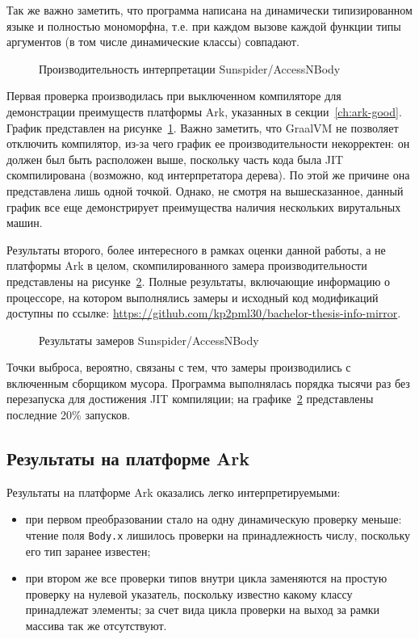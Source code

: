 \documentclass[times
]{itmo-student-thesis}
\begin{document}
Так же важно заметить, что программа написана на динамически типизированном языке и полностью мономорфна, т.е. при каждом вызове каждой функции типы аргументов (в том числе динамические классы) совпадают.

\begin{figure}[!h]
	\caption{Производительность интерпретации Sunspider/AccessNBody}\label{fig:accessnbodyinterpres}
	\resizebox{\textwidth}{!}{}
\end{figure}

Первая проверка производилась при выключенном компиляторе для демонстрации преимуществ платформы Ark, указанных в секции~\ref{ch:ark-good}. График представлен на рисунке~\ref{fig:accessnbodyinterpres}. Важно заметить, что GraalVM не позволяет отключить компилятор, из-за чего график ее производительности некорректен: он должен был быть расположен выше, поскольку часть кода была JIT скомпилирована (возможно, код интерпретатора дерева). По этой же причине она представлена лишь одной точкой. Однако, не смотря на вышесказанное, данный график все еще демонстрирует преимущества наличия нескольких вирутальных машин.

Результаты второго, более интересного в рамках оценки данной работы, а не платформы Ark в целом, скомпилированного замера производительности представлены на рисунке~\ref{fig:accessnbodyres}. Полные результаты, включающие информацию о процессоре, на котором выполнялись замеры и исходный код модификаций доступны по ссылке: \url{https://github.com/kp2pml30/bachelor-thesis-info-mirror}.
\begin{figure}[!h]
	\caption{Результаты замеров Sunspider/AccessNBody}\label{fig:accessnbodyres}
	\resizebox{\textwidth}{!}{}
\end{figure}

Точки выброса, вероятно, связаны с тем, что замеры производились с включенным сборщиком мусора. Программа выполнялась порядка тысячи раз без перезапуска для достижения JIT компиляции; на графике~\ref{fig:accessnbodyres} представлены последние 20\% запусков.

\subsection{Результаты на платформе Ark}
Результаты на платформе Ark оказались легко интерпретируемыми:
\begin{itemize}
\item при первом преобразовании стало на одну динамическую проверку меньше: чтение поля \texttt{Body.x} лишилось проверки на принадлежность числу, поскольку его тип заранее известен;
\item при втором же все проверки типов внутри цикла заменяются на простую проверку на нулевой указатель, поскольку известно какому классу принадлежат элементы; за счет вида цикла проверки на выход за рамки массива так же отсутствуют.
\end{itemize}
\end{document}
